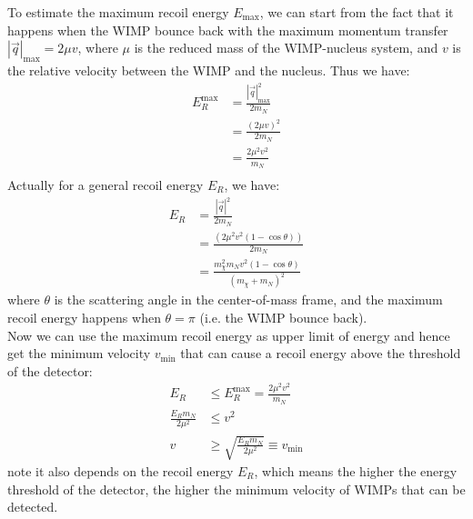 \begin{foundation}
    To estimate the maximum recoil energy $E_{\mathrm{max}}$, we can start from the fact that it happens when the WIMP bounce back with the maximum momentum transfer $|\vec{q}|_{\mathrm{max}} = 2 \mu v$, where $\mu$ is the reduced mass of the WIMP-nucleus system, and $v$ is the relative velocity between the WIMP and the nucleus. Thus we have:
    \begin{align*}
        E_R^\mathrm{max} &= \frac{|\vec{q}|_{\mathrm{max}}^2}{2 m_N} \\
        &= \frac{(2 \mu v)^2}{2 m_N} \\
        &= \frac{2 \mu^2 v^2}{m_N} \\          
    \end{align*}
    Actually for a general recoil energy $E_R$, we have:
    \begin{align*}
        E_R &= \frac{|\vec{q}|^2}{2 m_N} \\
        &= \frac{(2 \mu^2 v^2 (1 - \cos\theta))}{2 m_N} \\
        &= \frac{m_\chi^2 m_N v^2 (1 - \cos\theta)}{(m_\chi + m_N)^2}
    \end{align*}
    where $\theta$ is the scattering angle in the center-of-mass frame, and the maximum recoil energy happens when $\theta = \pi$ (i.e. the WIMP bounce back). \\

    Now we can use the maximum recoil energy as upper limit of energy and hence get the minimum velocity $v_{\mathrm{min}}$ that can cause a recoil energy above the threshold of the detector:
    \begin{align*}
        E_R &\leq E_R^\mathrm{max} = \frac{2 \mu^2 v^2}{m_N} \\
        \frac{E_R m_N}{2 \mu^2} &\leq v^2 \\
        v &\geq \sqrt{\frac{E_R m_N}{2 \mu^2}} \equiv v_{\mathrm{min}}
    \end{align*}
    note it also depends on the recoil energy $E_R$, which means the higher the energy threshold of the detector, the higher the minimum velocity of WIMPs that can be detected.
\end{foundation}

